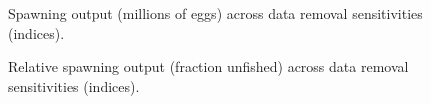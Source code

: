 \documentclass[
]{scrartcl}
\begin{document}
\newpage

\begin{figure}[H]


\caption{\label{fig-sens_indices_spout}Spawning output (millions of
eggs) across data removal sensitivities (indices).}

\end{figure}%

\begin{figure}[H]


\caption{\label{fig-sens_indices_relsp}Relative spawning output
(fraction unfished) across data removal sensitivities (indices).}

\end{figure}%
\end{document}

